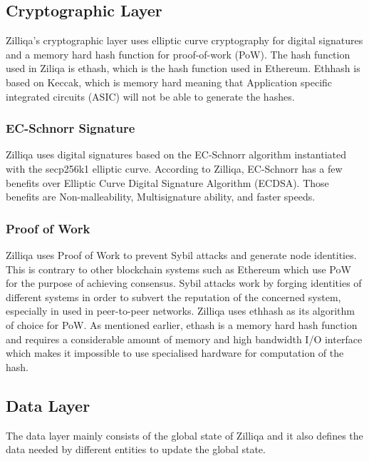 \documentclass[a4paper,twoside,phd]{BYUPhys}
\begin{document}
\subsection{Cryptographic Layer}
Zilliqa's cryptographic layer uses elliptic curve cryptography for digital signatures and a memory hard hash function for proof-of-work (PoW). The hash function used in Ziliqa is ethash, which is the hash function used in Ethereum. Ethhash is based on Keccak, which is memory hard meaning that Application specific integrated circuits (ASIC) will not be able to generate the hashes. 
\subsubsection{EC-Schnorr Signature}
Zilliqa uses digital signatures based on the EC-Schnorr algorithm instantiated with the secp256k1 elliptic curve. According to Zilliqa, EC-Schnorr has a few benefits over Elliptic Curve Digital Signature Algorithm (ECDSA). Those benefits are Non-malleability, Multisignature ability, and faster speeds. 

\subsubsection{Proof of Work}
Zilliqa uses Proof of Work to prevent Sybil attacks and generate node identities. This is contrary to other blockchain systems such as Ethereum which use PoW for the purpose of achieving consensus. Sybil attacks work by forging identities of different systems in order to subvert the reputation of the concerned system, especially in used in peer-to-peer networks. Zilliqa uses ethhash as its algorithm of choice for PoW. As mentioned earlier, ethash is a memory hard hash function and requires a considerable amount of memory and high bandwidth I/O interface which makes it impossible to use specialised hardware for computation of the hash.
\subsection{Data Layer}
The data layer mainly consists of the global state of Zilliqa and it also defines the data needed by different entities to update the global state. 
\end{document}
